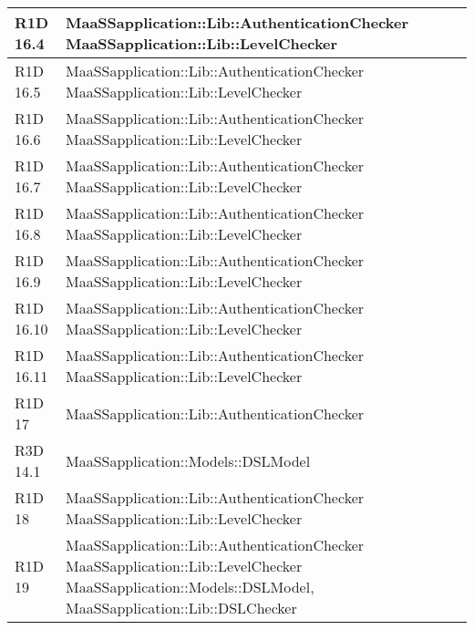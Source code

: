 \begin{center}
\begin{longtable}{ | l | p{8cm} |}
    R1D 16.4 & MaaSSapplication::Lib::AuthenticationChecker \newline MaaSSapplication::Lib::LevelChecker \\ \hline

    R1D 16.5 & MaaSSapplication::Lib::AuthenticationChecker \newline MaaSSapplication::Lib::LevelChecker \\ \hline
    
    R1D 16.6 & MaaSSapplication::Lib::AuthenticationChecker \newline MaaSSapplication::Lib::LevelChecker \\ \hline
    
    R1D 16.7 & MaaSSapplication::Lib::AuthenticationChecker \newline MaaSSapplication::Lib::LevelChecker \\ \hline
    
    R1D 16.8 & MaaSSapplication::Lib::AuthenticationChecker \newline MaaSSapplication::Lib::LevelChecker \\ \hline

    R1D 16.9 & MaaSSapplication::Lib::AuthenticationChecker \newline MaaSSapplication::Lib::LevelChecker \\ \hline
    
    R1D 16.10 & MaaSSapplication::Lib::AuthenticationChecker \newline MaaSSapplication::Lib::LevelChecker \\ \hline
    
    R1D 16.11 & MaaSSapplication::Lib::AuthenticationChecker \newline MaaSSapplication::Lib::LevelChecker \\ \hline
    
    R1D 17 & MaaSSapplication::Lib::AuthenticationChecker \\ \hline
    
    R3D 14.1 & MaaSSapplication::Models::DSLModel \\ \hline
    
    R1D 18 & MaaSSapplication::Lib::AuthenticationChecker \newline MaaSSapplication::Lib::LevelChecker \\ \hline
    
    R1D 19 & MaaSSapplication::Lib::AuthenticationChecker \newline MaaSSapplication::Lib::LevelChecker \newline  MaaSSapplication::Models::DSLModel, MaaSSapplication::Lib::DSLChecker \newline\\ \hline
    

\end{longtable}
\end{center}
